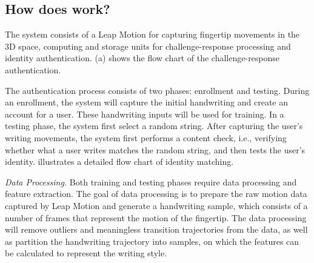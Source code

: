 \subsection{{How does \CiT work?}}



The \CiT system consists of a Leap Motion for capturing fingertip movements in the 3D space, computing and storage units for challenge-response processing and identity authentication. (a) shows the flow chart of the challenge-response authentication. 

The \CiT authentication process consists of two phases: enrollment and testing. During an enrollment, the system will capture the initial handwriting and create an account for a user. These handwriting inputs will be used for training. In a testing phase, the system first select a random string. After capturing the user's writing movements, the system first performs a content check, i.e., verifying whether what a user writes matches the random string, and then tests the user's identity.   illustrates a detailed flow chart of identity matching. 





\emph{Data Processing.} Both training and testing phases require data processing and feature extraction. The goal of data processing is to prepare the raw motion data captured by Leap Motion and generate a handwriting sample, which consists of a number of frames that represent the motion of the fingertip. 
The data processing will remove outliers and meaningless transition trajectories from the data,  as well as partition the handwriting trajectory into samples, on which the features can be calculated to represent the writing style. 


